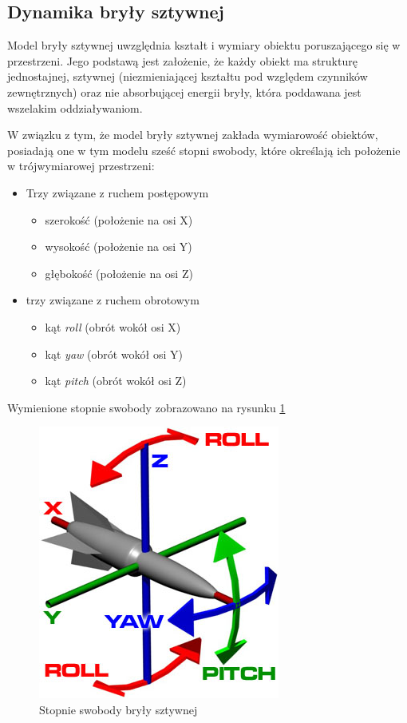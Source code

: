 \subsection{Dynamika bryły sztywnej}
\par{
Model bryły sztywnej uwzględnia kształt i wymiary obiektu poruszającego się w przestrzeni. Jego podstawą jest założenie, że każdy obiekt ma strukturę jednostajnej, sztywnej (niezmieniającej kształtu pod względem czynników zewnętrznych) oraz nie absorbującej energii bryły, która poddawana jest wszelakim oddziaływaniom.
}
\par{
W związku z tym, że model bryły sztywnej zakłada wymiarowość obiektów, posiadają one w tym modelu sześć stopni swobody, które określają ich położenie w trójwymiarowej przestrzeni:
\begin{itemize}
\renewcommand{\labelitemi}{$\bullet$}
\item Trzy związane z ruchem postępowym
	\begin{itemize}
	\item szerokość (położenie na osi X)
	\item wysokość (położenie na osi Y)
	\item głębokość (położenie na osi Z)
	\end{itemize}
\item trzy związane z ruchem obrotowym
	\begin{itemize}
	\item kąt \textit{roll} (obrót wokół osi X)
	\item kąt \textit{yaw} (obrót wokół osi Y)
	\item kąt \textit{pitch} (obrót wokół osi Z)
	\end{itemize}
\end{itemize}
Wymienione stopnie swobody zobrazowano na rysunku \ref{ryp}
\begin{figure}[htb]
    \begin{center}
	\includegraphics[]{img/xyz_ryp.jpg}
	\caption{Stopnie swobody bryły sztywnej \cite{Bryla}}
	\label{ryp}
    \end{center}
\end{figure}
}
